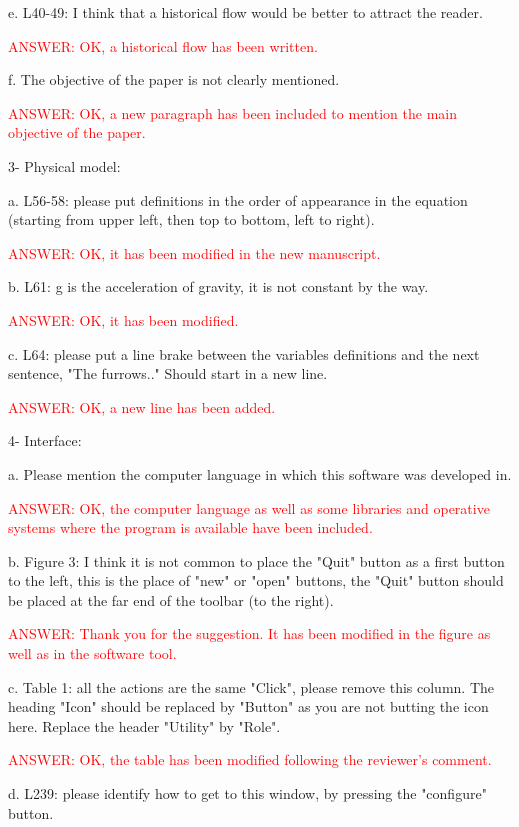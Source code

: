 \documentclass[a4paper]{article}
\begin{document}
e. L40-49: I think that a historical flow would be better to attract the reader.

\textcolor{red}{ANSWER: OK, a historical flow has been written.}

f. The objective of the paper is not clearly mentioned.

\textcolor{red}{ANSWER: OK, a new paragraph has been included to mention the
main objective of the paper.}

3- Physical model:

a. L56-58: please put definitions in the order of appearance in the equation (starting from upper left, then top to bottom, left to right).

\textcolor{red}{ANSWER: OK, it has been modified in the new manuscript.}

b. L61: g is the acceleration of gravity, it is not constant by the way.

\textcolor{red}{ANSWER: OK, it has been modified.}

c. L64: please put a line brake between the variables definitions and the next sentence, "The furrows.." Should start in a new line.

\textcolor{red}{ANSWER: OK, a new line has been added.}

4- Interface:

a. Please mention the computer language in which this software was developed in.

\textcolor{red}{ANSWER: OK, the computer language as well as some libraries and
operative systems where the program is available have been included.}

b. Figure 3: I think it is not common to place the "Quit" button as a first button to the left, this is the place of "new" or "open" buttons, the "Quit" button should be placed at the far end of the toolbar (to the right).

\textcolor{red}{ANSWER: Thank you for the suggestion. It has been modified in
the figure as well as in the software tool.}

c. Table 1: all the actions are the same "Click", please remove this column. The heading "Icon" should be replaced by "Button" as you are not butting the icon here. Replace the header "Utility" by "Role".

\textcolor{red}{ANSWER: OK, the table has been modified following the reviewer's
comment.}

d. L239: please identify how to get to this window, by pressing the "configure" button.
\end{document}
